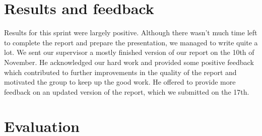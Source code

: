 \section{Results and feedback}

Results for this sprint were largely positive. Although there wasn't much
time left to complete the report and prepare the presentation,
we managed to write quite a lot. We sent our supervisor a mostly finished version of our report on
the 10th of November. He acknowledged our hard work and provided some positive feedback
which contributed to further improvements in the quality of the report and motivated the group
to keep up the good work. He offered to provide more feedback on an updated version of the report,
which we submitted on the 17th.

\section{Evaluation}

